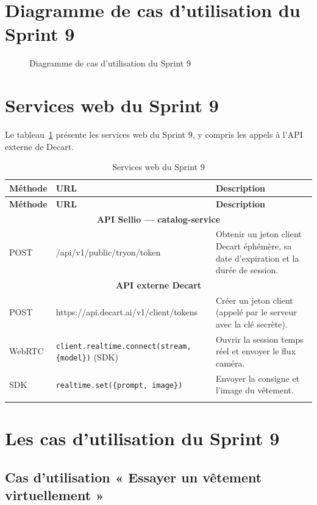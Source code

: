 \section{Diagramme de cas d'utilisation du Sprint 9}
\begin{figure}[H]
    \centering
    \caption{Diagramme de cas d'utilisation du Sprint 9}
    \label{fig:cu-sprint9}
\end{figure}

\section{Services web du Sprint 9}
Le tableau~\ref{tab:ws-sprint9} présente les services web du Sprint 9, y compris les appels à l'API externe de Decart.
\renewcommand{\arraystretch}{1.15}
\setlength{\tabcolsep}{4pt}
\begin{longtable}{|p{2cm}|p{7cm}|p{5.9cm}|}
\hline
\textbf{Méthode} & \textbf{URL} & \textbf{Description} \\
\hline
\endfirsthead
\hline
\textbf{Méthode} & \textbf{URL} & \textbf{Description} \\
\hline
\endhead
\multicolumn{3}{|c|}{\textbf{API Sellio --- catalog-service}} \\
\hline
POST & /api/v1/public/tryon/token & Obtenir un jeton client Decart éphémère, sa date d'expiration et la durée de session. \\
\hline
\multicolumn{3}{|c|}{\textbf{API externe Decart}} \\
\hline
POST & https://api.decart.ai/v1/client/tokens & Créer un jeton client (appelé par le serveur avec la clé secrète). \\
\hline
WebRTC & \texttt{client.realtime.connect(stream, \{model\})} (SDK) & Ouvrir la session temps réel et envoyer le flux caméra. \\
\hline
SDK & \texttt{realtime.set(\{prompt, image\})} & Envoyer la consigne et l'image du vêtement. \\
\hline
\caption{Services web du Sprint 9}
\label{tab:ws-sprint9}
\end{longtable}

\section{Les cas d'utilisation du Sprint 9}
\subsection{Cas d'utilisation « Essayer un vêtement virtuellement »}
